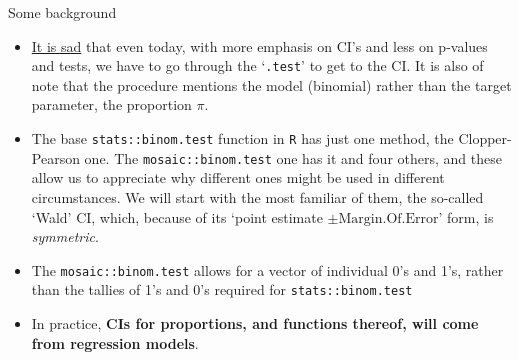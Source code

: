 \documentclass[10pt]{beamer}\usepackage[]{graphicx}\usepackage[]{color}
\begin{document}
\begin{frame}{Some background}
	\small
	
	\begin{itemize}
		\item \underline{It is sad} that even today, with more emphasis on CI's and less on p-values and tests, we have to go through the `\texttt{.test}' to get to the CI. It is also of note that the procedure mentions the model (binomial) rather than the target parameter, the proportion $\pi.$ 
		
		\item The base \texttt{stats::binom.test} function in \texttt{R} has just one method, the Clopper-Pearson one. The \texttt{mosaic::binom.test} one has it and four others, and these allow us to appreciate why different ones might be used in different circumstances. We will start with the most familiar of them, the so-called `Wald' CI, which, because of its `point estimate $\pm \textrm{Margin.Of.Error}$' form, is \textit{symmetric}. 
		
		\item The \texttt{mosaic::binom.test} allows for a vector of individual 0's and 1's, rather than the tallies of 1's and 0's required for \texttt{stats::binom.test} 
		
		\pause
		
		\item In practice, \textbf{CIs for proportions, and functions thereof, will come from regression models}. 
		
	\end{itemize}
\end{frame}
\end{document}
